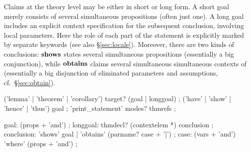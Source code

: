 Claims at the theory level may be either in short or long form.  A
short goal merely consists of several simultaneous propositions (often
just one).  A long goal includes an explicit context specification for
the subsequent conclusion, involving local parameters.  Here the role
of each part of the statement is explicitly marked by separate
keywords (see also \S\ref{sec:locale}).
Moreover, there are two
kinds of conclusions: ${\mathord{\mathbf{shows}}}$ states several
simultaneous propositions (essentially a big conjunction), while
${\mathord{\mathbf{obtains}}}$ claims several simultaneous simultaneous
contexts of (essentially a big disjunction of eliminated parameters
and assumptions, cf.\ \S\ref{sec:obtain}).

\begin{rail}
  ('lemma' | 'theorem' | 'corollary') target? (goal | longgoal)
  ;
  ('have' | 'show' | 'hence' | 'thus') goal
  ;
  'print\_statement' modes? thmrefs
  ;
  
  goal: (props + 'and')
  ;
  longgoal: thmdecl? (contextelem *) conclusion
  ;
  conclusion: 'shows' goal | 'obtains' (parname? case + '|')
  ;
  case: (vars + 'and') 'where' (props + 'and')
  ;
\end{rail}

